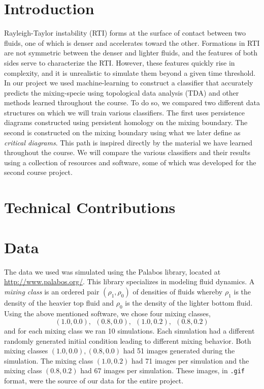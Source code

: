 \documentclass[12pt, fullpage,letterpaper]{article}
\theoremstyle{definition}
\begin{document}
	\section*{\normalfont Introduction}
	Rayleigh-Taylor instability (RTI) forms at the surface of contact between two fluids, one of which is denser and accelerates toward the other. Formations in RTI are not symmetric between the denser and lighter fluids, and the features of both sides serve to characterize the RTI. However, these features quickly rise in complexity, and it is unrealistic to simulate them beyond a given time threshold. In our project we used machine-learning to construct a classifier that accurately predicts the mixing-specie using topological data analysis (TDA) and other methods learned throughout the course. To do so, we compared two different data structures on which we will train various classifiers. The first uses persistence diagrams constructed using persistent homology on the mixing boundary. The second is constructed on the mixing boundary using what we later define as \emph{critical diagrams}. This path is inspired directly by the material we have learned throughout the course. We will compare the various classifiers and their results using a collection of resources and software, some of which was developed for the second course project.
	
	\section*{\normalfont Technical Contributions}
	
	\section*{\normalfont Data}
	The data we used was simulated using the Palabos library, located at \url{http://www.palabos.org/}. This library specializes in modeling fluid dynamics. A \emph{mixing class} is an ordered pair $(\rho_1, \rho_0)$ of densities of fluids whereby $\rho_1$ is the density of the heavier top fluid and $\rho_0$ is the density of the lighter bottom fluid. Using the above mentioned software, we chose four mixing classes, 
	$$
		(1.0, 0.0), \ \ (0.8, 0.0), \ \ (1.0, 0.2), \ \ (0.8, 0.2)
	$$
	and for each mixing class we ran 10 simulations. Each simulation had a different randomly generated initial condition leading to different mixing behavior. Both mixing classes $(1.0, 0.0), (0.8, 0.0)$ had 51 images generated during the simulation. The mixing class $(1.0, 0.2)$ had 71 images per simulation and the mixing class $(0.8, 0.2)$ had 67 images per simulation. These images, in \texttt{.gif} format, were the source of our data for the entire project. 
	
\end{document}
